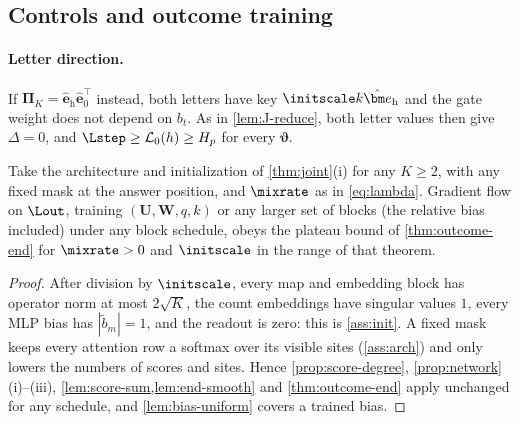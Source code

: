 

\subsection{Controls and outcome training}

\paragraph{Letter direction.} If $\bm\Pi_K=\hat{\bm e}_{\mathrm h}\hat{\bm e}_0^\top$ instead, both letters have key $\initscale k\hat{\bm e}_{\mathrm h}$ and the gate weight does not depend on $b_t$.
As in \cref{lem:J-reduce}, both letter values then give $\Delta=0$, and $\Lstep\ge \mathcal L_0(h)\ge H_p$ for every $\bm\vartheta$.

\begin{corollary}
\label{cor:joint-outcome}
Take the architecture and initialization of \cref{thm:joint}(i) for any $K\ge2$, with any fixed mask at the answer position, and $\mixrate$ as in
\cref{eq:lambda}. Gradient flow on $\Lout$, training $(\mathbf U,\mathbf W,q,k)$ or any larger set of blocks (the relative bias included) under any block
schedule, obeys the plateau bound of \cref{thm:outcome-end} for $\mixrate>0$ and $\initscale$ in the range of that theorem.
\end{corollary}

\begin{proof}
After division by $\initscale$, every map and embedding block has operator norm at most $2\sqrt K$, the count embeddings have singular values
$1$, every MLP bias has $|\tilde b_m|=1$, and the readout is zero: this is \cref{ass:init}. A fixed mask keeps every attention row a softmax over
its visible sites (\cref{ass:arch}) and only lowers the numbers of scores and sites. Hence \cref{prop:score-degree}, \cref{prop:network}(i)--(iii),
\cref{lem:score-sum,lem:end-smooth} and \cref{thm:outcome-end} apply unchanged for any schedule, and \cref{lem:bias-uniform} covers a trained bias.
\end{proof}

